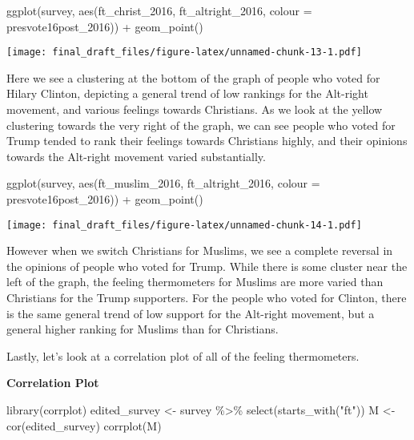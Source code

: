 \documentclass[
]{article}
\newenvironment{Shaded}{\begin{snugshade}}{\end{snugshade}}
\newcommand{\AttributeTok}[1]{\textcolor[rgb]{0.77,0.63,0.00}{#1}}
\newcommand{\FunctionTok}[1]{\textcolor[rgb]{0.00,0.00,0.00}{#1}}
\newcommand{\NormalTok}[1]{#1}
\newcommand{\OtherTok}[1]{\textcolor[rgb]{0.56,0.35,0.01}{#1}}
\newcommand{\SpecialCharTok}[1]{\textcolor[rgb]{0.00,0.00,0.00}{#1}}
\newcommand{\StringTok}[1]{\textcolor[rgb]{0.31,0.60,0.02}{#1}}
\begin{document}
\begin{Shaded}
\begin{Highlighting}[]
\FunctionTok{ggplot}\NormalTok{(survey, }\FunctionTok{aes}\NormalTok{(ft\_christ\_2016, ft\_altright\_2016, }\AttributeTok{colour =}\NormalTok{ presvote16post\_2016)) }\SpecialCharTok{+} 
  \FunctionTok{geom\_point}\NormalTok{()}
\end{Highlighting}
\end{Shaded}

\texttt{[image: final\_draft\_files/figure-latex/unnamed-chunk-13-1.pdf]}

Here we see a clustering at the bottom of the graph of people who voted
for Hilary Clinton, depicting a general trend of low rankings for the
Alt-right movement, and various feelings towards Christians. As we look
at the yellow clustering towards the very right of the graph, we can see
people who voted for Trump tended to rank their feelings towards
Christians highly, and their opinions towards the Alt-right movement
varied substantially.

\begin{Shaded}
\begin{Highlighting}[]
\FunctionTok{ggplot}\NormalTok{(survey, }\FunctionTok{aes}\NormalTok{(ft\_muslim\_2016, ft\_altright\_2016, }\AttributeTok{colour =}\NormalTok{ presvote16post\_2016)) }\SpecialCharTok{+} 
  \FunctionTok{geom\_point}\NormalTok{()}
\end{Highlighting}
\end{Shaded}

\texttt{[image: final\_draft\_files/figure-latex/unnamed-chunk-14-1.pdf]}

However when we switch Christians for Muslims, we see a complete
reversal in the opinions of people who voted for Trump. While there is
some cluster near the left of the graph, the feeling thermometers for
Muslims are more varied than Christians for the Trump supporters. For
the people who voted for Clinton, there is the same general trend of low
support for the Alt-right movement, but a general higher ranking for
Muslims than for Christians.

Lastly, let's look at a correlation plot of all of the feeling
thermometers.

\textbf{Correlation Plot}

\begin{Shaded}
\begin{Highlighting}[]
\FunctionTok{library}\NormalTok{(corrplot)}
\NormalTok{edited\_survey }\OtherTok{\textless{}{-}}\NormalTok{ survey }\SpecialCharTok{\%\textgreater{}\%} \FunctionTok{select}\NormalTok{(}\FunctionTok{starts\_with}\NormalTok{(}\StringTok{"ft"}\NormalTok{))}
\NormalTok{M }\OtherTok{\textless{}{-}} \FunctionTok{cor}\NormalTok{(edited\_survey)}
\FunctionTok{corrplot}\NormalTok{(M)}
\end{Highlighting}
\end{Shaded}
\end{document}
